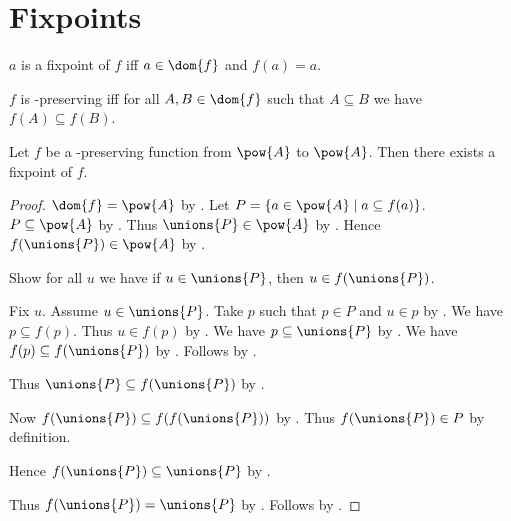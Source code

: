 


\section{Fixpoints}

\begin{definition}\label{fixpoint}
    $a$ is a fixpoint of $f$ iff $a\in\dom{f}$ and $f(a) = a$.
\end{definition}

\begin{definition}\label{subseteqpreserving}
    $f$ is \subseteq-preserving iff
    for all $A, B\in\dom{f}$ such that $A\subseteq B$ we have $f(A)\subseteq f(B)$.
\end{definition}

\begin{theorem}\label{knastertarski}
    Let $f$ be a \subseteq-preserving function from $\pow{A}$ to $\pow{A}$.
    Then there exists a fixpoint of $f$.
\end{theorem}
\begin{proof}
    $\dom{f} = \pow{A}$ by .
    Let $P = \{a\in\pow{A}\mid a\subseteq f(a)\}$.
    $P\subseteq\pow{A}$ by .
    Thus $\unions{P}\in\pow{A}$ by .
    Hence $f(\unions{P})\in\pow{A}$ by .

    Show for all $u$ we have if $u\in\unions{P}$, then $u\in f(\unions{P})$.
    \begin{subproof}
        Fix $u$.
        Assume $u\in\unions{P}$.
        Take $p$ such that $p\in P$ and $u\in p$ by .
        We have $p\subseteq f(p)$.
        Thus $u\in f(p)$ by .
        We have $p\subseteq\unions{P}$ by .
        We have $f(p)\subseteq f(\unions{P})$ by .
        Follows by .
    \end{subproof}
    Thus $\unions{P}\subseteq f(\unions{P})$ by .

    Now $f(\unions{P})\subseteq f(f(\unions{P}))$ by .
    Thus $f(\unions{P})\in P$ by definition.

    Hence $f(\unions{P})\subseteq \unions{P}$ by .

    Thus $f(\unions{P}) = \unions{P}$ by .
    Follows by .
\end{proof}
